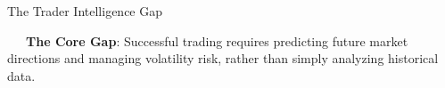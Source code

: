 \documentclass{beamer}
\begin{document}
\begin{frame}{The Trader Intelligence Gap}
\vspace{0.15cm}
\begin{tcolorbox}[enhanced, colback=primaryblue!4, colframe=primaryblue!30, boxrule=0.35pt,
  arc=3.5pt, width=0.98\textwidth, left=4pt, right=4pt, top=2.5pt, bottom=2.5pt, boxsep=0pt,
  halign=center, shadow={0.5pt}{-0.5pt}{0pt}{black!8}]
    \fontsize{5.5pt}{6.5pt}\selectfont
    \textcolor{primaryDark}{~~~\textbf{The Core Gap}: Successful trading requires predicting future market directions and managing volatility risk, rather than simply analyzing historical data.}
\end{tcolorbox}
\end{frame}

\end{document}
